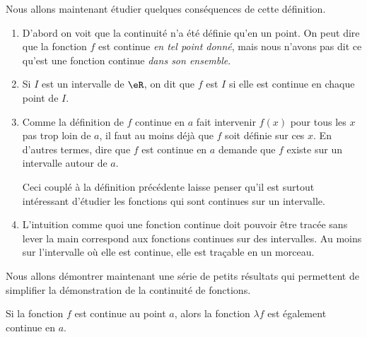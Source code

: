 Nous allons maintenant étudier quelques conséquences de cette définition. 

\begin{enumerate}
\item D'abord on voit que la continuité n'a été définie qu'en un point. On peut dire que la fonction $f$ est continue \emph{en tel point donné}, mais nous n'avons pas dit ce qu'est une fonction continue \emph{dans son ensemble}.

\item Si $I$ est un intervalle de $\eR$, on dit que $f$ est  $I$ si elle est continue en chaque point de $I$.

\item Comme la définition de $f$ continue en $a$ fait intervenir $f(x)$ pour tous les $x$ pas trop loin de $a$, il faut au moins déjà que $f$ soit définie sur ces $x$. En d'autres termes, dire que $f$ est continue en $a$ demande que $f$ existe sur un intervalle autour de $a$. 

Ceci couplé à la définition précédente laisse penser qu'il est surtout intéressant d'étudier les fonctions qui sont continues sur un intervalle.

\item L'intuition comme quoi une fonction continue doit pouvoir être tracée sans lever la main correspond aux fonctions continues sur des intervalles. Au moins sur l'intervalle où elle est continue, elle est traçable en un morceau.
\end{enumerate}


Nous allons démontrer maintenant une série de petits résultats qui permettent de simplifier la démonstration de la continuité de fonctions.
\begin{theorem}
Si la fonction $f$ est continue au point $a$, alors la fonction $\lambda f$ est également continue en $a$.
\end{theorem}

